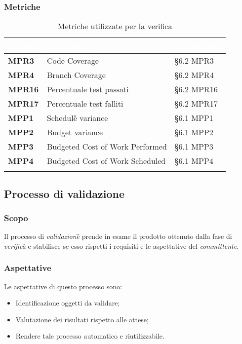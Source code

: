 								
				\subsubsection{Metriche}
					\setlength{\freewidth}{\dimexpr\textwidth-0\tabcolsep}
					\renewcommand{\arraystretch}{1.5}
					\setlength{\aboverulesep}{0pt}
					\setlength{\belowrulesep}{0pt}
					\begin{longtable}{L{.22\freewidth} L{.4\freewidth} L{.2\freewidth}}
						\toprule
						\textcolor{white}{\textbf{Metrica}}&
						\textcolor{white}{\textbf{Descrizione}}&	
						\textcolor{white}{\textbf{Riferimento}}\\
						\toprule
						\endhead
						
						\textbf{MPR3} & Code Coverage & \S 6.2 MPR3 \\
						\textbf{MPR4} & Branch Coverage & \S 6.2 MPR4 \\
						\textbf{MPR16} & Percentuale test passati & \S 6.2 MPR16 \\
						\textbf{MPR17} & Percentuale test falliti & \S 6.2 MPR17 \\
						\textbf{MPP1} & Schedule\G{} variance & \S 6.1 MPP1 \\
						\textbf{MPP2} & Budget variance & \S 6.1 MPP2 \\
						\textbf{MPP3} & Budgeted Cost of Work Performed & \S 6.1 MPP3 \\
						\textbf{MPP4} & Budgeted Cost of Work Scheduled & \S 6.1 MPP4 \\

						\bottomrule
						\caption{Metriche utilizzate per la verifica}
					\end{longtable}
			
		\subsection{Processo di validazione}
			\subsubsection{Scopo}
				Il processo di \emph{validazione}\G{} prende in esame il prodotto ottenuto dalla fase di \emph{verifica}\G{} e stabilisce se esso rispetti i requisiti e le aspettative del \emph{committente}.
			\subsubsection{Aspettative}
				Le aspettative di questo processo sono:
					\begin{itemize}
						\item Identificazione oggetti da validare;
						\item Valutazione dei risultati rispetto alle attese;
						\item Rendere tale processo automatico e riutilizzabile.
					\end{itemize}
